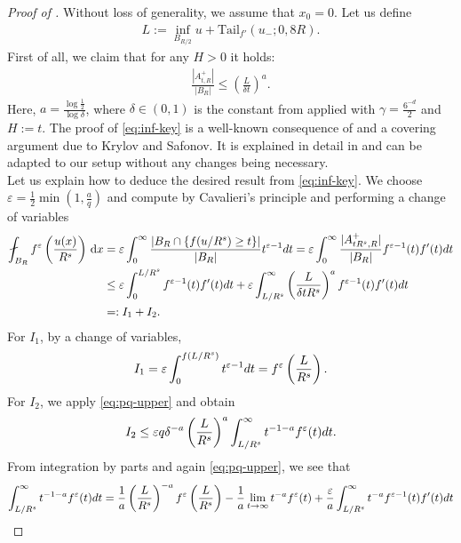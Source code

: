 \documentclass[11pt]{amsart}
\theoremstyle{plain}
\theoremstyle{definition}
\numberwithin{equation}{section}
\renewcommand{\d}{\textnormal{d}}
\newcommand{\dx} {\,\mathrm{d}x}
\newcommand{\eps}{\varepsilon}
\begin{document}
\begin{proof}[Proof of ]
Without loss of generality, we assume that $x_0 = 0$.
Let us define
\begin{align*}
L := \inf_{B_{R/2}} u + \mathrm{Tail}_{f'}(u_-;0,8R).
\end{align*}
First of all, we claim that for any $H > 0$ it holds:
\begin{align}
\label{eq:inf-key}
\frac{|A^+_{t,R}|}{|B_R|} \le \left( \frac{L}{\delta t} \right)^a.
\end{align}
Here, $a = \frac{\log \frac{1}{2}}{\log \delta}$, where $\delta \in (0,1)$ is the constant from  applied with $\gamma = \frac{6^{-d}}{2}$ and $H := t$. 
The proof of \eqref{eq:inf-key} is a well-known consequence of  and a covering argument due to Krylov and Safonov. It is explained in detail in \cite[Lemma 6.7 and (6.41)]{Coz17} and can be adapted to our setup without any changes being necessary.\\
Let us explain how to deduce the desired result from \eqref{eq:inf-key}. We choose $\eps = \frac{1}{2}\min(1,\frac{a}{q})$ and compute by Cavalieri's principle and performing a change of variables
\begin{align*}
\fint_{B_R} f^{\eps}\left( \frac{u(x)}{R^s} \right) \dx &= \eps \int_{0}^{\infty} \frac{|B_R \cap \{ f(u/R^s) \ge t \}|}{|B_R|} t^{\eps - 1} \d t = \eps \int_{0}^{\infty} \frac{|A^+_{tR^s,R}|}{|B_R|} f^{\eps-1}(t) f'(t) \d t\\
&\le \eps \int_0^{L/R^s} f^{\eps-1}(t) f'(t) \d t + \eps \int_{L/R^s}^{\infty}  \left( \frac{L}{\delta t R^s} \right)^a f^{\eps-1}(t) f'(t) \d t\\
&=: I_1 + I_2.
\end{align*}
For $I_1$, by a change of variables,
\begin{align}
\label{eq:inf-I1}
I_1 = \eps \int_0^{f(L/R^s)} t^{\eps - 1} \d t = f^{\eps}\left( \frac{L}{R^s} \right).
\end{align}
For $I_2$, we apply \eqref{eq:pq-upper} and obtain
\begin{align*}
I_2 \le \eps q \delta^{-a} \left( \frac{L}{R^s} \right)^a \int_{L/R^s}^{\infty} t^{-1-a} f^{\eps}(t) \d t.
\end{align*}
From integration by parts and again \eqref{eq:pq-upper}, we see that
\begin{align*}
\int_{L/R^s}^{\infty} t^{-1-a} f^{\eps}(t) \d t &= \frac{1}{a} \left(\frac{L}{R^s}\right)^{-a} f^{\eps} \left( \frac{L}{R^s} \right) - \frac{1}{a}\lim_{t \to \infty} t^{-a}f^{\eps}(t) + \frac{\eps}{a} \int_{L/R^s}^{\infty} t^{-a} f^{\eps - 1}(t) f'(t) \d t\\

\end{align*}
\end{proof}
\end{document}
